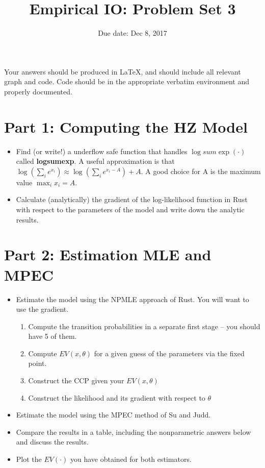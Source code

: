\documentclass{article}
\title{Empirical IO: Problem Set 3}
\begin{document}
\small
\date{Due date: Dec 8, 2017}
\maketitle
Your answers should be produced in \LaTeX, and should include all relevant graph and code.  Code should be in the appropriate verbatim environment and properly documented.
\section*{Part 1: Computing the HZ Model}
\begin{itemize}
\item Find (or write!) a underflow safe function that handles $\log sum \exp (\cdot)$ called \textbf{logsumexp}. A useful approximation is that $\log (\sum_i e^{x_i}) \approx \log (\sum_i e^{x_i -A}) +A$. A good choice for A is the maximum value $\max_i x_i = A$.
\item Calculate (analytically) the gradient of the log-likelihood function in Rust with respect to the parameters of the model and write down the analytic results.
\end{itemize}

\section*{Part 2: Estimation MLE and MPEC}
\begin{itemize}
\item Estimate the model using the NPMLE approach of Rust. You will want to use the gradient.
\begin{enumerate}
\item Compute the transition probabilities in a separate first stage -- you should have 5 of them.
\item Compute $EV(x, \theta)$ for a given guess of the parameters via the fixed point.
\item Construct the CCP given your $EV(x, \theta)$
\item Construct the likelihood and its gradient with respect to $\theta$
\end{enumerate}
\item Estimate the model using the MPEC method of Su and Judd.
\item Compare the results in a table, including the nonparametric answers below and discuss the results.
\item Plot the $EV(\cdot)$ you have obtained for both estimators.
\end{itemize}
\end{document}

